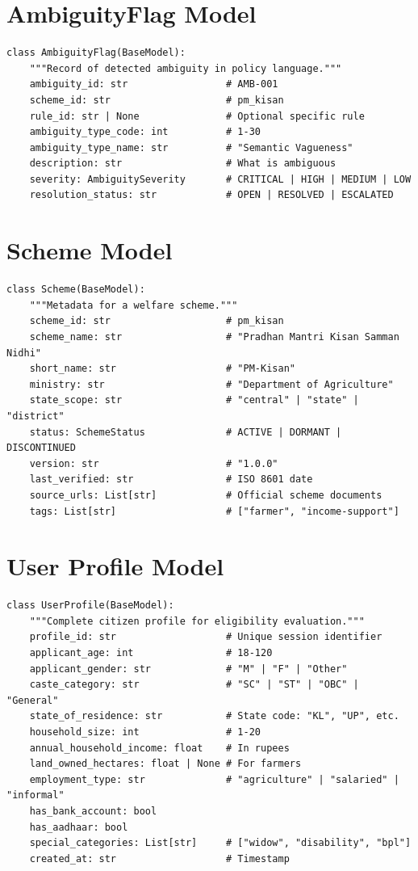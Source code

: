 \documentclass[11pt,a4paper]{report}
\begin{document}
\section{AmbiguityFlag Model}

\begin{lstlisting}
class AmbiguityFlag(BaseModel):
    """Record of detected ambiguity in policy language."""
    ambiguity_id: str                 # AMB-001
    scheme_id: str                    # pm_kisan
    rule_id: str | None               # Optional specific rule
    ambiguity_type_code: int          # 1-30
    ambiguity_type_name: str          # "Semantic Vagueness"
    description: str                  # What is ambiguous
    severity: AmbiguitySeverity       # CRITICAL | HIGH | MEDIUM | LOW
    resolution_status: str            # OPEN | RESOLVED | ESCALATED
\end{lstlisting}

\section{Scheme Model}

\begin{lstlisting}
class Scheme(BaseModel):
    """Metadata for a welfare scheme."""
    scheme_id: str                    # pm_kisan
    scheme_name: str                  # "Pradhan Mantri Kisan Samman Nidhi"
    short_name: str                   # "PM-Kisan"
    ministry: str                     # "Department of Agriculture"
    state_scope: str                  # "central" | "state" | "district"
    status: SchemeStatus              # ACTIVE | DORMANT | DISCONTINUED
    version: str                      # "1.0.0"
    last_verified: str                # ISO 8601 date
    source_urls: List[str]            # Official scheme documents
    tags: List[str]                   # ["farmer", "income-support"]
\end{lstlisting}

\section{User Profile Model}

\begin{lstlisting}
class UserProfile(BaseModel):
    """Complete citizen profile for eligibility evaluation."""
    profile_id: str                   # Unique session identifier
    applicant_age: int                # 18-120
    applicant_gender: str             # "M" | "F" | "Other"
    caste_category: str               # "SC" | "ST" | "OBC" | "General"
    state_of_residence: str           # State code: "KL", "UP", etc.
    household_size: int               # 1-20
    annual_household_income: float    # In rupees
    land_owned_hectares: float | None # For farmers
    employment_type: str              # "agriculture" | "salaried" | "informal"
    has_bank_account: bool
    has_aadhaar: bool
    special_categories: List[str]     # ["widow", "disability", "bpl"]
    created_at: str                   # Timestamp
\end{lstlisting}
\end{document}

